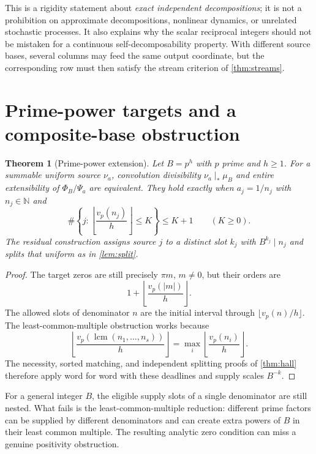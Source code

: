 \documentclass[11pt,a4paper]{article}
\newtheorem{theorem}{Theorem}[section]
\theoremstyle{remark}
\newcommand{\N}{\mathbb N}
\newcommand{\lcm}{\operatorname{lcm}}
\begin{document}
This is a rigidity statement about \emph{exact independent decompositions}; it
is not a prohibition on approximate decompositions, nonlinear dynamics, or
unrelated stochastic processes. It also explains why the scalar reciprocal
integers should not be mistaken for a continuous self-decomposability property.
With different source bases, several columns may feed the same output
coordinate, but the corresponding row must then satisfy the stream criterion
of \cref{thm:streams}.

\section{Prime-power targets and a composite-base obstruction}
\label{sec:primepower}

\begin{theorem}[Prime-power extension]
\label{thm:primepower}
Let $B=p^h$ with $p$ prime and $h\ge1$. For a summable uniform source $\nu_a$,
convolution divisibility $\nu_a\mid_*\mu_B$ and entire extensibility of
$\Phi_B/\Psi_a$ are equivalent. They hold exactly when $a_j=1/n_j$ with
$n_j\in\N$ and
\begin{equation}
 \#\left\{j:\left\lfloor\frac{v_p(n_j)}h\right\rfloor\le K\right\}
 \le K+1\qquad(K\ge0).
 \label{eq:primepower-hall}
\end{equation}
The residual construction assigns source $j$ to a distinct slot $k_j$ with
$B^{k_j}\mid n_j$ and splits that uniform as in \cref{lem:split}.
\end{theorem}
\begin{proof}
The target zeros are still precisely $\pi m$, $m\ne0$, but their orders are
\[
 1+\left\lfloor\frac{v_p(|m|)}h\right\rfloor.
\]
The allowed slots of denominator $n$ are the initial interval through
$\lfloor v_p(n)/h\rfloor$. The least-common-multiple obstruction works because
\[
 \left\lfloor\frac{v_p(\lcm(n_1,\ldots,n_s))}h\right\rfloor
 =\max_i\left\lfloor\frac{v_p(n_i)}h\right\rfloor.
\]
The necessity, sorted matching, and independent splitting proofs of
\cref{thm:hall} therefore apply word for word with these deadlines and
supply scales $B^{-k}$.
\end{proof}

For a general integer $B$, the eligible supply slots of a single denominator
are still nested. What fails is the least-common-multiple reduction: different
prime factors can be supplied by different denominators and can create extra
powers of $B$ in their least common multiple. The resulting analytic zero
condition can miss a genuine positivity obstruction.
\end{document}
